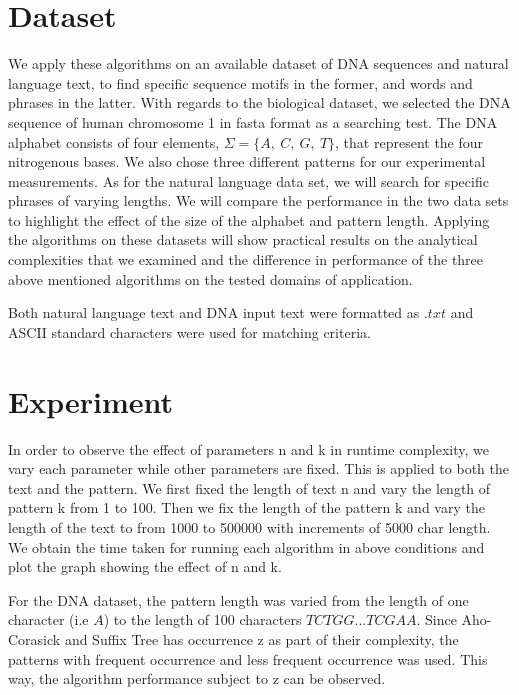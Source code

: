 \documentclass[paper=a4, fontsize=11pt]{scrartcl} %
\numberwithin{equation}{section} %
\numberwithin{figure}{section} %
\numberwithin{table}{section} %
\begin{document}
\newpage
\section{Dataset}
We apply these algorithms on an available dataset of DNA sequences and natural language text, to find specific sequence motifs in the former, and words and phrases in the latter. With regards to the biological dataset, we selected the DNA sequence of human chromosome 1 in fasta format as a searching test. The DNA alphabet consists of four elements, $\Sigma = \{A,\ C,\ G,\ T\}$, that represent  the four nitrogenous bases. We also chose three different patterns for our experimental measurements. As for the natural language data set, we will search for specific phrases of varying lengths. We will compare the performance in the two data sets to highlight the effect of the size of the alphabet and pattern length. Applying the algorithms on these datasets will show practical results on the analytical complexities that we examined and the difference in performance of the three above mentioned algorithms on the tested domains of application.

Both natural language text and DNA input text were formatted as $.txt$ and ASCII standard characters were used for matching criteria.

\section{Experiment}
In order to observe the effect of parameters n and k in runtime complexity, we vary each parameter while other parameters are fixed. This is applied to both the text and the pattern. We first fixed the length of text n and vary the length of pattern k from 1 to 100. Then we fix the length of the pattern k and vary the length of the text to from 1000 to 500000 with increments of 5000 char length. We obtain the time taken for running each algorithm in above conditions and plot the graph showing the effect of n and k.

For the DNA dataset, the pattern length was varied from the length of one character (i.e $A$) to the length of 100 characters $TCTGG...TCGAA$. Since Aho-Corasick and Suffix Tree has occurrence z as part of their complexity, the patterns with frequent occurrence and less frequent occurrence was used. This way, the algorithm performance subject to z can be observed. 
\end{document}

